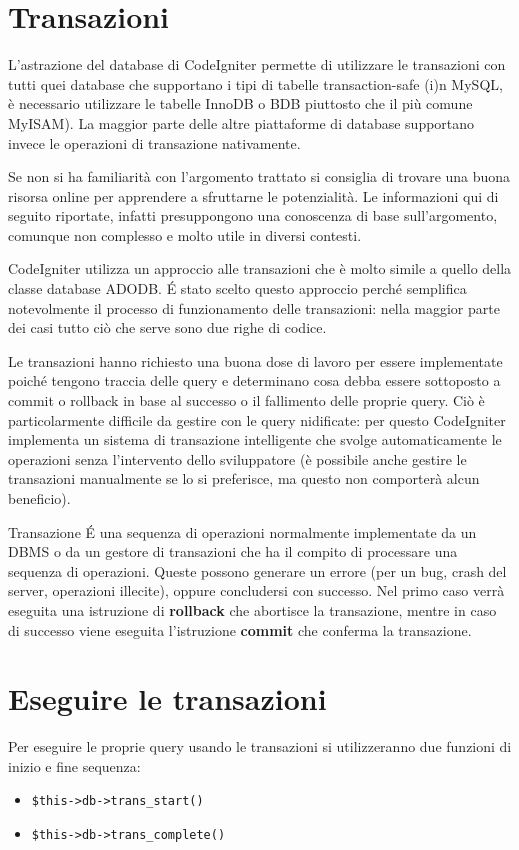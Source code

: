 \section*{Transazioni}
L'astrazione del database di CodeIgniter permette di utilizzare le transazioni con tutti quei database che supportano i tipi di tabelle transaction-safe (i)n MySQL, è necessario utilizzare le tabelle InnoDB o BDB piuttosto che il più comune MyISAM). La maggior parte delle altre piattaforme di database supportano invece le operazioni di transazione nativamente.

Se non si ha familiarità con l'argomento trattato si consiglia di trovare una buona risorsa online per apprendere a sfruttarne le potenzialità. Le informazioni qui di seguito riportate, infatti presuppongono una conoscenza di base sull'argomento, comunque non complesso e molto utile in diversi contesti.

CodeIgniter utilizza un approccio alle transazioni che è molto simile a quello della classe database ADODB. \'E stato scelto questo approccio perché semplifica notevolmente il processo di funzionamento delle transazioni: nella maggior parte dei casi tutto ciò che serve sono due righe di codice.

Le transazioni hanno richiesto una buona dose di lavoro per essere implementate poiché tengono traccia delle query e determinano cosa debba essere sottoposto a commit o rollback in base al successo o il fallimento delle proprie query. Ciò è particolarmente difficile da gestire con le query nidificate: per questo CodeIgniter implementa un sistema di transazione intelligente che svolge automaticamente le operazioni senza l'intervento dello sviluppatore (è possibile anche gestire le transazioni manualmente se lo si preferisce, ma questo non comporterà alcun beneficio).

\begin{deftabv}{Transazione}{
\'E una sequenza di operazioni normalmente implementate da un DBMS o da un gestore di transazioni che ha il compito di processare una sequenza di operazioni. Queste possono generare un errore (per un bug, crash del server, operazioni illecite), oppure concludersi con successo. Nel primo caso verrà eseguita una istruzione di \textbf{rollback} che abortisce la transazione, mentre in caso di successo viene eseguita l'istruzione \textbf{commit} che conferma la transazione.
}
\end{deftabv}
\normalsize

\section*{Eseguire le transazioni}
Per eseguire le proprie query usando le transazioni si utilizzeranno due funzioni di inizio e fine sequenza:
\begin{itemize}
\item  \verb|$this->db->trans_start()|
\item \verb|$this->db->trans_complete()|
\end{itemize}


